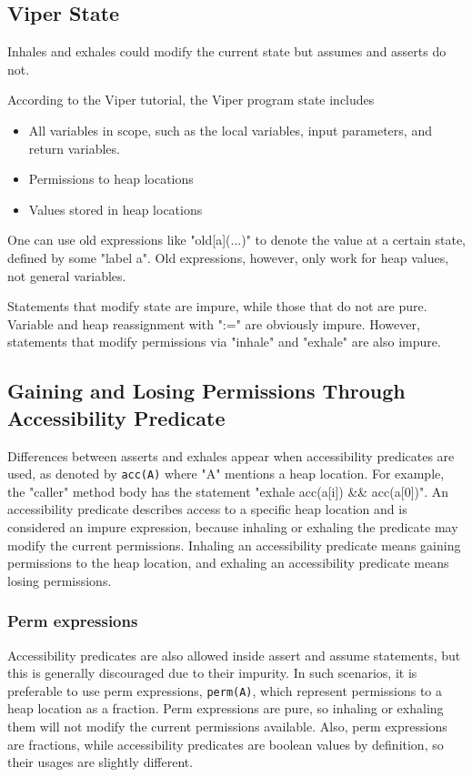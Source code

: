 \documentclass[msc,oneside]{ubcthesis}
\theoremstyle{definition}
\begin{document}
\subsection{Viper State}
Inhales and exhales could modify the current state but assumes and asserts do not.

According to the Viper tutorial, the Viper program state includes 
\begin{itemize}
    \item All variables in scope, such as the local variables, input parameters, and return variables.  
    \item Permissions to heap locations
    \item Values stored in heap locations
\end{itemize}

One can use old expressions like "old[a](...)" to denote the value at a certain state, defined by some "label a". Old expressions, however, only work for heap values, not general variables.

Statements that modify state are impure, while those that do not are pure. Variable and heap reassignment with ":=" are obviously impure. However, statements that modify permissions via "inhale" and "exhale" are also impure.

\subsection{Gaining and Losing Permissions Through Accessibility Predicate}
Differences between asserts and exhales appear when accessibility predicates are used, as denoted by \lstinline{acc(A)} where "A" mentions a heap location. For example, the "caller" method body has the statement "exhale acc(a[i]) && acc(a[0])". An accessibility predicate describes access to a specific heap location and is considered an impure expression, because inhaling or exhaling the predicate may modify the current permissions. Inhaling an accessibility predicate means gaining permissions to the heap location, and exhaling an accessibility predicate means losing permissions. 

\subsubsection{Perm expressions}
Accessibility predicates are also allowed inside assert and assume statements, but this is generally discouraged due to their impurity. In such scenarios, it is preferable to use perm expressions, \lstinline{perm(A)}, which represent permissions to a heap location as a fraction. Perm expressions are pure, so inhaling or exhaling them will not modify the current permissions available. Also, perm expressions are fractions, while accessibility predicates are boolean values by definition, so their usages are slightly different.
\end{document}
